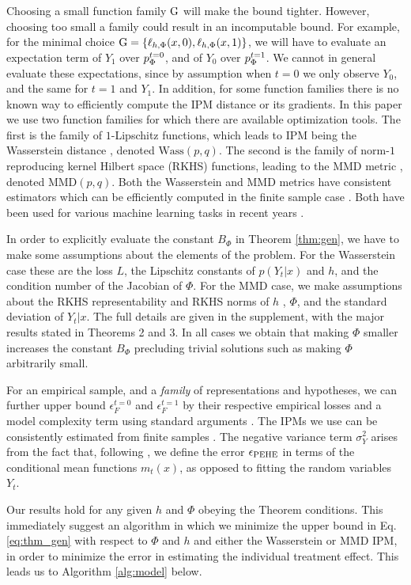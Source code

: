 Choosing a small function family $\mathrm{G}$ will make the bound tighter. However, choosing too small a family could result in an incomputable bound. For example, for the minimal choice $\mathrm{G} = \{\ell_{h,\Phi}(x,0), \ell_{h,\Phi}(x,1)  \}$, we will have to evaluate an expectation term of $Y_1$ over $p^{t=0}_\Phi$, and of $Y_0$ over $p^{t=1}_\Phi$. We cannot in general evaluate these expectations, since by assumption when $t=0$ we only observe $Y_0$, and the same for $t=1$ and $Y_1$. In addition, for some function families there is no known way to efficiently compute the IPM distance or its gradients. In this paper we use two function families for which there are available optimization tools. The first is the family of $1$-Lipschitz functions, which leads to IPM being the Wasserstein distance \citep{villani2008optimal,sriperumbudur2012empirical}, denoted $\text{Wass}(p,q)$. The second is the family of norm-$1$ reproducing kernel Hilbert space (RKHS) functions, leading to the MMD metric \citep{gretton2012mmd,sriperumbudur2012empirical}, denoted $\text{MMD}(p,q)$. Both the Wasserstein and MMD metrics have consistent estimators which can be efficiently computed in the finite sample case \citep{sriperumbudur2012empirical}. Both have been used for various machine learning tasks in recent years \citep{gretton2009covariate,gretton2012mmd,cuturi2014fast}.


In order to explicitly evaluate the constant $B_\Phi$ in Theorem \ref{thm:gen}, we have to make some assumptions about the elements of the problem. For the Wasserstein case these are the loss $L$, the Lipschitz constants of $p(Y_t|x)$ and $h$, and the condition number of the Jacobian of $\Phi$. For the MMD case, we make assumptions about the RKHS representability and RKHS norms of $h$ , $\Phi$, and the standard deviation of $Y_t|x$. The full details are given in the supplement, with the major results stated in Theorems 2 and 3. In all cases we obtain that making $\Phi$ smaller increases the constant $B_\Phi$ precluding trivial solutions such as making $\Phi$ arbitrarily small.


For an empirical sample, and a \emph{family} of representations and hypotheses, we can further upper bound $\epsilon_F^{t=0}$ and $\epsilon_F^{t=1}$ by their respective empirical losses and a model complexity term using standard arguments \citep{shalev2014understanding}. The IPMs we use can be consistently estimated from finite samples \citep{sriperumbudur2012empirical}. The negative variance term $\sigma^2_Y$ arises from the fact that, following \citet{hill2011bayesian,athey2016recursive}, we define the error $\epsilon_{\text{PEHE}}$ in terms of the conditional mean functions $m_t(x)$, as opposed to fitting the random variables $Y_t$.

Our results hold for any given $h$ and $\Phi$ obeying the Theorem conditions. This immediately suggest an algorithm in which we minimize the upper bound in Eq. \eqref{eq:thm_gen} with respect to $\Phi$ and $h$ and either the Wasserstein or MMD IPM, in order to minimize the error in estimating the individual treatment effect. This leads us to Algorithm \ref{alg:model} below.
